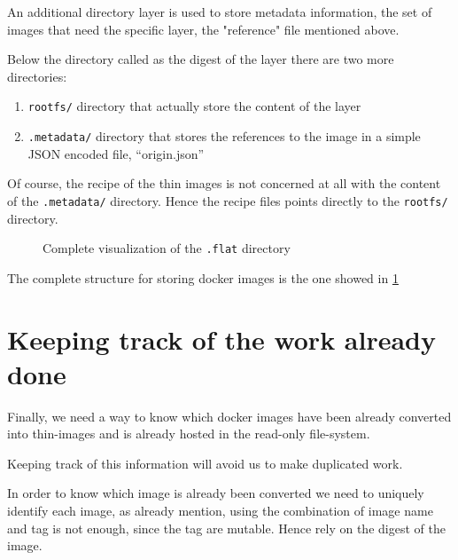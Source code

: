 An additional directory layer is used to store metadata information, the set of images that need the specific layer, the "reference" file mentioned above.

Below the directory called as the digest of the layer there are two more directories: 
\begin{enumerate} 
        \item \texttt{rootfs/} directory that actually store the content of the layer
        \item \texttt{.metadata/} directory that stores the references to the image in a simple JSON encoded file, “origin.json”
\end{enumerate}

Of course, the recipe of the thin images is not concerned at all with the content of the \texttt{.metadata/} directory. 
Hence the recipe files points directly to the \texttt{rootfs/} directory.

\begin{figure}
\caption{Complete visualization of the \texttt{.flat} directory}
\label{fig:docker-layer-structure}
\end{figure}

The complete structure for storing docker images is the one showed in \ref{fig:docker-layer-structure}

\section{Keeping track of the work already done}

Finally, we need a way to know which docker images have been already converted into thin-images and is already hosted in the read-only file-system.

Keeping track of this information will avoid us to make duplicated work.

In order to know which image is already been converted we need to uniquely identify each image, as already mention, using the combination of image name and tag is not enough, since the tag are mutable.
Hence rely on the digest of the image.

